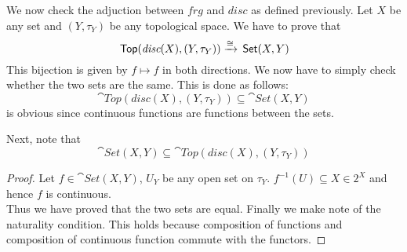 \begin{frame}
    
We now check the adjuction between \(frg\) and \(disc\) as  defined previously.
Let \(X \) be any set and \((Y,\tau_Y)\) be any topological space. We have to
prove that 
\begin{equation}
    \,\textsf{Top}(\textit{disc}(X) , (Y, \tau_Y)  ) \xrightarrow{\cong} \,\textsf{Set}(X, Y)
\end{equation}
This bijection is given by  \(f \mapsto f \) in both directions. We now have to
simply check whether the two sets are the same. This is done as follows: 
\begin{equation}
    \cat{Top}(\textit{disc}(X) , (Y, \tau_Y)  ) \subseteq \cat{Set}(X, Y)
\end{equation}
is obvious since continuous functions are functions between the sets. 
\end{frame}
\begin{frame}
    
Next, note that 
\begin{equation}
    \cat{Set}(X, Y) \subseteq \cat{Top}(\textit{disc}(X) , (Y, \tau_Y)  )
\end{equation}

\begin{proof}
    Let \(f \in \cat{Set}(X,Y)\),  \(U_Y\) be any open set on \(\tau_Y\).
    \(f^{-1}(U) \subseteq X \in 2^X\) and hence \(f\) is continuous. \\
    Thus we have proved that the two sets are equal. Finally we make note of the
    naturality condition. This holds because composition of functions and
    composition of continuous function commute with the functors. 
\end{proof}
\end{frame}

